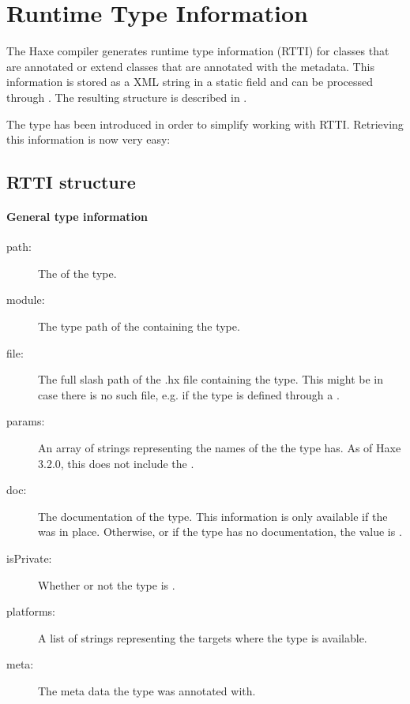 \section{Runtime Type Information}
\label{cr-rtti}

The Haxe compiler generates runtime type information (RTTI) for classes that are annotated or extend classes that are annotated with the  metadata. This information is stored as a XML string in a static field  and can be processed through . The resulting structure is described in .


The type  has been introduced in order to simplify working with RTTI. Retrieving this information is now very easy:


\subsection{RTTI structure}
\label{cr-rtti-structure}

\paragraph{General type information}

\begin{description}
    \item[path:] The  of the type.
    \item[module:] The type path of the  containing the type.
    \item[file:] The full slash path of the .hx file containing the type. This might be  in case there is no such file, e.g. if the type is defined through a .
    \item[params:] An array of strings representing the names of the  the type has. As of Haxe 3.2.0, this does not include the .
    \item[doc:] The documentation of the type. This information is only available if the   was in place. Otherwise, or if the type has no documentation, the value is .
    \item[isPrivate:] Whether or not the type is .
    \item[platforms:] A list of strings representing the targets where the type is available.
    \item[meta:] The meta data the type was annotated with.
\end{description}
    
